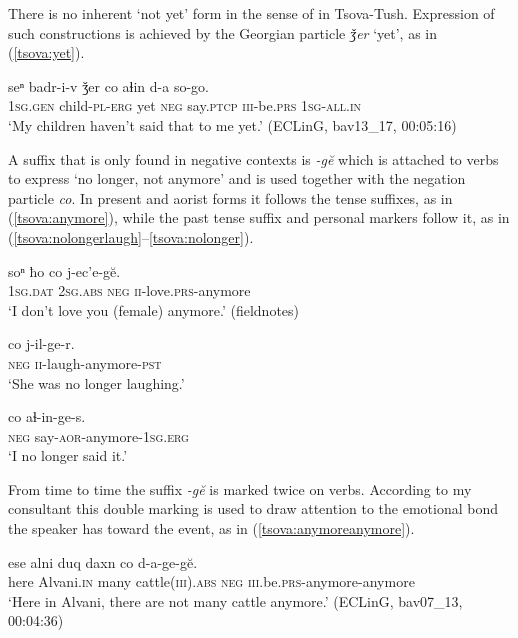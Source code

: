 \documentclass[output=paper,%
colorlinks,citecolor=brown,
showindex
]{langscibook}
\begin{document}
There is no inherent `not yet' form in the sense of \citet[54–55]{Comrie1985} in Tsova-Tush. Expression of such constructions is achieved by the Georgian particle \textit{ǯer} `yet', as in (\ref{tsova:yet}).

\ea	\label{tsova:yet}
\gll 	seⁿ badr-i-v ǯer co aɬin d-a so-go.\\
	\textsc{1sg.gen} child-\textsc{pl-erg} 	yet \textsc{neg} say.\textsc{ptcp} \textsc{iii}-be.\textsc{prs} \textsc{1sg-all.in}\\
\glt `My children haven't said that to me yet.' (ECLinG, bav13\_17, 00:05:16)
\z

A suffix that is only found in negative contexts is \textit{-gĕ} which is attached to verbs to express `no longer, not anymore' and is used together with the negation particle \textit{co}. In present and aorist forms it follows the tense suffixes,  as in (\ref{tsova:anymore}), while the past tense suffix and personal markers follow it, as in (\ref{tsova:nolongerlaugh}--\ref{tsova:nolonger}).

\ea	\label{tsova:anymore}
\gll 	soⁿ	ħo	co	j-ec’e-gĕ.\\  
	\textsc{1sg.dat} \textsc{2sg.abs} \textsc{neg} \textsc{ii}-love.\textsc{prs}-anymore\\
\glt `I don't love you (female) anymore.' (fieldnotes)
\z

\ea	\label{tsova:nolongerlaugh}
\gll 	co j-il-ge-r.\\  
	\textsc{neg} \textsc{ii}-laugh-anymore-\textsc{pst}\\
\glt `She was no longer laughing.' \citep[187]{HoliskyGagua1994} 
\z

\ea	\label{tsova:nolonger}
\gll 	co aɬ-in-ge-s.\\  
	\textsc{neg} say-\textsc{aor}-anymore-\textsc{1sg.erg}\\
\glt `I no longer said it.' \citep[187]{HoliskyGagua1994} 
\z

From time to time the suffix \textit{-gĕ} is marked twice on verbs. According to my consultant this double marking  is used to draw attention to the emotional bond the speaker has toward the event, as in (\ref{tsova:anymoreanymore}).

\ea	\label{tsova:anymoreanymore}
\gll 	ese alni duq daxn co d-a-ge-gĕ.\\  
	here Alvani\textsc{.in} many cattle\textsc{(iii).abs} \textsc{neg}  \textsc{iii}.be.\textsc{prs}-anymore-anymore\\
\glt `Here in Alvani, there are not many cattle anymore.' (ECLinG, bav07\_13, 00:04:36)
\z
\end{document}
